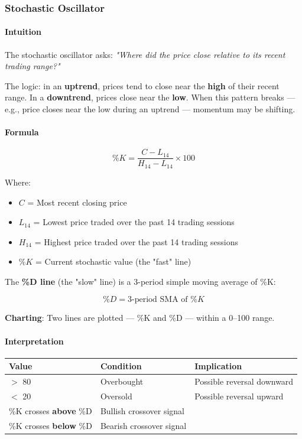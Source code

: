 \documentclass[12pt,openany]{book}
\begin{document}
\subsubsection{Stochastic Oscillator}

\paragraph{Intuition}
The stochastic oscillator asks: \emph{"Where did the price close relative to its recent trading range?"}

The logic: in an \textbf{uptrend}, prices tend to close near the \textbf{high} of their recent range. In a \textbf{downtrend}, prices close near the \textbf{low}. When this pattern breaks --- e.g., price closes near the low during an uptrend --- momentum may be shifting.

\paragraph{Formula}

\[
\%K = \frac{C - L_{14}}{H_{14} - L_{14}} \times 100
\]

Where:
\begin{itemize}[leftmargin=*]
    \item \(C\) = Most recent closing price
    \item \(L_{14}\) = Lowest price traded over the past 14 trading sessions
    \item \(H_{14}\) = Highest price traded over the past 14 trading sessions
    \item \(\%K\) = Current stochastic value (the "fast" line)
\end{itemize}

The \textbf{\%D line} (the "slow" line) is a 3-period simple moving average of \%K:

\[
\%D = \text{3-period SMA of } \%K
\]

\textbf{Charting}: Two lines are plotted --- \%K and \%D --- within a 0--100 range.

\paragraph{Interpretation}

\begin{center}
\small
\renewcommand{\arraystretch}{1.2}
\begin{tabular}{|L{0.25\textwidth}|L{0.34\textwidth}|L{0.31\textwidth}|}
\hline
 \textbf{Value} & \textbf{Condition} & \textbf{Implication} \\ \hline
 \(>\) 80 & Overbought & Possible reversal downward \\ \hline
 \(<\) 20 & Oversold & Possible reversal upward \\ \hline
 \%K crosses \textbf{above} \%D & Bullish crossover signal &  \\ \hline
 \%K crosses \textbf{below} \%D & Bearish crossover signal &  \\ \hline
\end{tabular}
\end{center}
\end{document}
